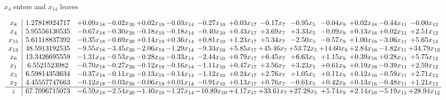 \documentclass[8pt]{article}
\begin{document}
 $ x_{4} $ enters and $ x_{14} $ leaves 

 \[\begin{array}{c| c c@{\hskip 2pt} c@{\hskip 2pt} c@{\hskip 2pt} c@{\hskip 2pt} c@{\hskip 2pt} c@{\hskip 2pt} c@{\hskip 2pt} c@{\hskip 2pt} c@{\hskip 2pt} c@{\hskip 2pt} c@{\hskip 2pt} c@{\hskip 2pt} }
 x_{8}   &  1.27818924717 & +  0.09 x_{18} & -0.02 x_{20} & +  0.02 x_{19} & -0.03 x_{14} & -0.27 x_{10} & +  0.03 x_{17} & -0.17 x_{7} & -0.95 x_{5} & -0.04 x_{9} & +  0.02 x_{16} & -0.44 x_{11} & -0.00 x_{12}\\
 x_{4}   &  5.95556130535 & -0.67 x_{18} & -0.30 x_{20} & -0.18 x_{19} & -0.18 x_{14} & -0.40 x_{10} & +  0.43 x_{17} & +  3.69 x_{7} & +  3.33 x_{5} & -0.09 x_{9} & +  0.13 x_{16} & +  0.02 x_{11} & +  2.51 x_{12}\\
 x_{15}   &  5.61118837392 & -0.35 x_{18} & -0.69 x_{20} & +  0.14 x_{19} & +  0.36 x_{14} & +  0.81 x_{10} & +  1.23 x_{17} & +  5.34 x_{7} & -2.50 x_{5} & -0.57 x_{9} & +  1.00 x_{16} & -3.06 x_{11} & +  5.65 x_{12}\\
 x_{13}   &  48.5913192535 & -9.55 x_{18} & -3.45 x_{20} & -2.06 x_{19} & -1.29 x_{14} & -9.33 x_{10} & +  5.85 x_{17} & + 45.46 x_{7} & + 53.72 x_{5} & + 14.60 x_{9} & +  2.84 x_{16} & -1.82 x_{11} & + 34.79 x_{12}\\
 x_{6}   &  13.3426695559 & -1.31 x_{18} & -0.53 x_{20} & -0.28 x_{19} & -0.33 x_{14} & -2.44 x_{10} & +  0.79 x_{17} & +  6.45 x_{7} & +  6.63 x_{5} & +  1.15 x_{9} & +  0.39 x_{16} & +  0.28 x_{11} & +  5.75 x_{12}\\
 x_{1}   &  6.5521523982 & -0.70 x_{18} & -0.27 x_{20} & -0.12 x_{19} & -0.16 x_{14} & -1.11 x_{10} & +  0.47 x_{17} & +  3.56 x_{7} & +  3.23 x_{5} & +  0.61 x_{9} & +  0.19 x_{16} & -0.39 x_{11} & +  2.59 x_{12}\\
 x_{3}   &  6.59814353634 & -0.37 x_{18} & -0.11 x_{20} & -0.13 x_{19} & -0.14 x_{14} & -1.12 x_{10} & +  0.24 x_{17} & +  2.76 x_{7} & +  1.05 x_{5} & +  0.11 x_{9} & +  0.12 x_{16} & -0.59 x_{11} & +  2.71 x_{12}\\
 x_{2}   &  4.45557747663 & -0.12 x_{18} & -0.03 x_{20} & -0.06 x_{19} & +  0.01 x_{14} & -0.91 x_{10} & +  0.13 x_{17} & +  0.76 x_{7} & -0.61 x_{5} & +  0.42 x_{9} & +  0.13 x_{16} & -0.48 x_{11} & +  1.21 x_{12}\\
\hline
z    &  67.7096715073 & -6.59 x_{18} & -2.54 x_{20} & -1.40 x_{19} & -1.27 x_{14} & -10.89 x_{10} & +  4.17 x_{17} & + 33.61 x_{7} & + 27.28 x_{5} & +  5.74 x_{9} & +  2.14 x_{16} & -5.19 x_{11} & + 28.94 x_{12}\\
\end{array}\]
\end{document}
